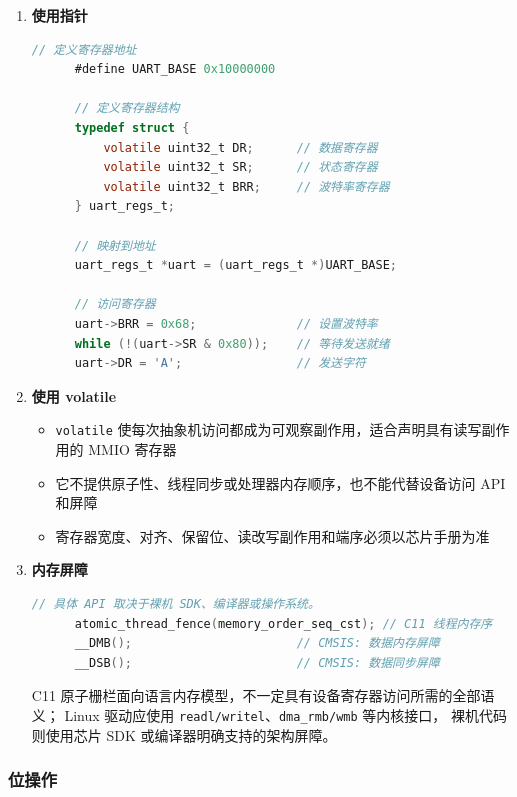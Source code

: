 \begin{enumerate}
  \item \textbf{使用指针}
    \begin{lstlisting}[language=C]
      // 定义寄存器地址
      #define UART_BASE 0x10000000

      // 定义寄存器结构
      typedef struct {
          volatile uint32_t DR;      // 数据寄存器
          volatile uint32_t SR;      // 状态寄存器
          volatile uint32_t BRR;     // 波特率寄存器
      } uart_regs_t;

      // 映射到地址
      uart_regs_t *uart = (uart_regs_t *)UART_BASE;

      // 访问寄存器
      uart->BRR = 0x68;              // 设置波特率
      while (!(uart->SR & 0x80));    // 等待发送就绪
      uart->DR = 'A';                // 发送字符
    \end{lstlisting}

  \item \textbf{使用 volatile}
    \begin{itemize}
      \item \texttt{volatile} 使每次抽象机访问都成为可观察副作用，适合声明具有读写副作用的 MMIO 寄存器
      \item 它不提供原子性、线程同步或处理器内存顺序，也不能代替设备访问 API 和屏障
      \item 寄存器宽度、对齐、保留位、读改写副作用和端序必须以芯片手册为准
    \end{itemize}

  \item \textbf{内存屏障}
    \begin{lstlisting}[language=C]
      // 具体 API 取决于裸机 SDK、编译器或操作系统。
      atomic_thread_fence(memory_order_seq_cst); // C11 线程内存序
      __DMB();                       // CMSIS: 数据内存屏障
      __DSB();                       // CMSIS: 数据同步屏障
    \end{lstlisting}

    C11 原子栅栏面向语言内存模型，不一定具有设备寄存器访问所需的全部语义；
    Linux 驱动应使用 \texttt{readl/writel}、\texttt{dma\_rmb/wmb} 等内核接口，
    裸机代码则使用芯片 SDK 或编译器明确支持的架构屏障。
\end{enumerate}

\subsubsection{位操作}


